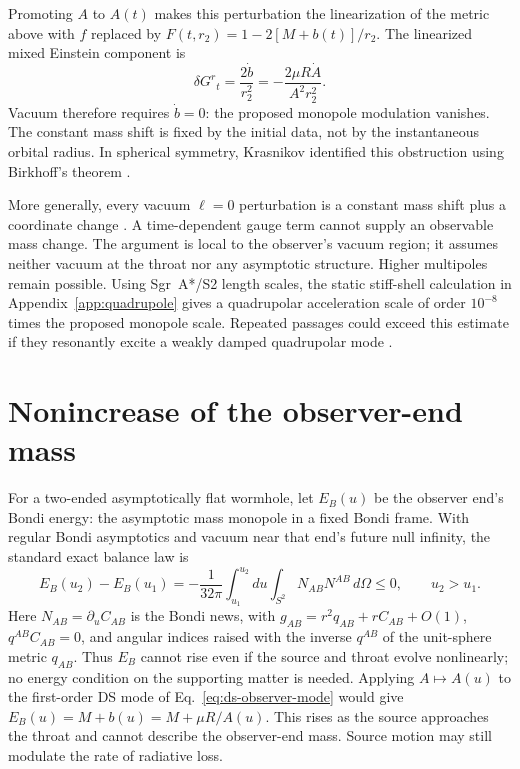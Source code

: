 \documentclass[aps,prd,10pt,onecolumn,nofootinbib,superscriptaddress,floatfix]{revtex4-2}
\begin{document}
\begin{samepage}
Promoting $A$ to $A(t)$ makes this perturbation the linearization of
the metric above with $f$ replaced by
$F(t,r_2)=1-2[M+b(t)]/r_2$.  The linearized mixed Einstein component is
\begin{equation}
 \delta G^r{}_t=\frac{2\dot b}{r_2^2}
 =-\frac{2\mu R\dot A}{A^2r_2^2}.
 \label{eq:momentum-constraint}
\end{equation}
Vacuum therefore requires $\dot b=0$: the proposed monopole modulation
vanishes.  The constant mass shift is fixed by the initial data, not by
the instantaneous orbital radius.
In spherical symmetry, Krasnikov identified this obstruction using
Birkhoff's theorem \cite{Krasnikov2020CommentObserving}.
\end{samepage}

More generally, every vacuum
$\ell=0$ perturbation is a constant mass shift plus a coordinate change
\cite{MartelPoisson2005SchwarzschildPerturbations}.
A time-dependent gauge term cannot supply an observable mass change.
The argument is local to the observer's vacuum region; it assumes
neither vacuum at the throat nor any asymptotic structure.
Higher multipoles remain possible.  Using Sgr~A*/S2 length scales, the
static stiff-shell calculation in Appendix~\ref{app:quadrupole} gives a
quadrupolar acceleration scale of order
$10^{-8}$ times the proposed monopole scale.  Repeated passages could
exceed this estimate if they resonantly excite a weakly damped quadrupolar
mode \cite{CardosoFranzinPani2016Ringdown}.

\section{Nonincrease of the observer-end mass}
\label{sec:nonlinear}

For a two-ended asymptotically flat wormhole, let $E_B(u)$ be the observer
end's Bondi energy: the asymptotic mass monopole in a fixed Bondi frame.
With regular Bondi asymptotics and vacuum near that end's future null
infinity, the standard exact balance law is
\cite{BondiVanderBurgMetzner1962Gravitational,Sachs1962Asymptotic,
WaldZoupas2000Conserved}
\begin{equation}
 E_B(u_2)-E_B(u_1)
 =-\frac{1}{32\pi}\int_{u_1}^{u_2}du
    \int_{S^2}N_{AB}N^{AB}\,d\Omega\le0,
 \qquad u_2>u_1.
 \label{eq:bondi-integrated}
\end{equation}
Here $N_{AB}=\partial_u C_{AB}$ is the Bondi news, with
$g_{AB}=r^2q_{AB}+rC_{AB}+O(1)$, $q^{AB}C_{AB}=0$, and angular indices
raised with the inverse $q^{AB}$ of the unit-sphere metric $q_{AB}$.
Thus $E_B$ cannot rise even if
the source and throat evolve nonlinearly; no energy condition on the
supporting matter is needed.  Applying $A\mapsto A(u)$ to the first-order
DS mode of Eq.~\eqref{eq:ds-observer-mode} would give
$E_B(u)=M+b(u)=M+\mu R/A(u)$.  This rises as the source approaches the
throat and cannot describe the observer-end mass.  Source motion may still
modulate the rate of radiative loss.
\end{document}
